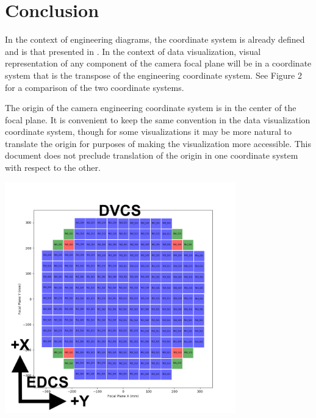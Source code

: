 \section{Conclusion}
In the context of engineering diagrams, the coordinate system is already defined and is that presented in . In the context of data visualization, visual representation of any component of the camera focal plane will be in a coordinate system that is the transpose of the engineering coordinate system.  See Figure 2 for a comparison of the two coordinate systems.

The origin of the camera engineering coordinate system is in the center of the focal plane. It is convenient to keep the same convention in the data visualization coordinate system, though for some visualizations it may be more natural to translate the origin for purposes of making the visualization more accessible. This document does not preclude translation of the origin in one coordinate system with respect to the other.

\begin{center}
\includegraphics[width=0.75\textwidth]{figures/fp.png}
\end{center}
